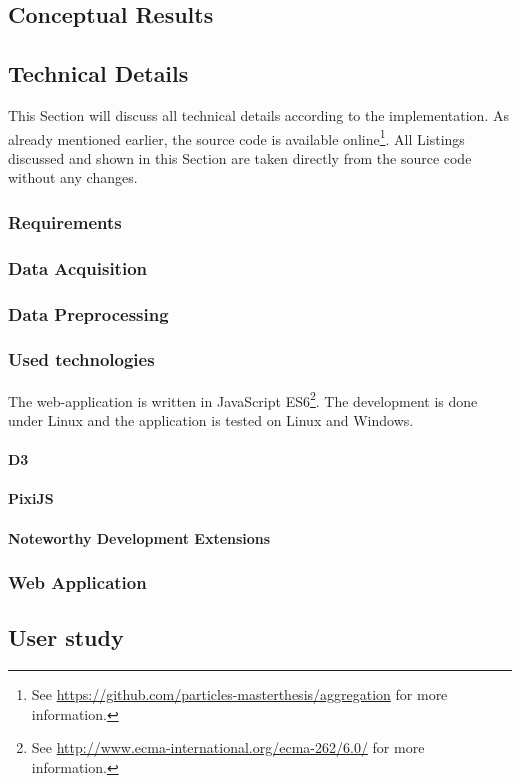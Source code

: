 \subsection{Conceptual Results}


\subsection{Technical Details}
\cbstart
This Section will discuss all technical details according to the implementation.
As already mentioned earlier, the source code is available online\footnote{See \href{https://github.com/particles-masterthesis/aggregation}{https://github.com/particles-masterthesis/aggregation} for more information.}. All Listings discussed and shown in this Section are taken directly from the source code without any changes.
\cbend

\subsubsection{Requirements}


\subsubsection{Data Acquisition}
\label{s:data-acquisition}


\subsubsection{Data Preprocessing}
\label{s:data-preprocessing}


\subsubsection{Used technologies}
The web-application is written in JavaScript ES6\footnote{See \href{http://www.ecma-international.org/ecma-262/6.0/}{http://www.ecma-international.org/ecma-262/6.0/} for more information.}. The development is done under Linux and the application is tested on Linux and Windows.

\paragraph{D3}


\paragraph{PixiJS}


\paragraph{Noteworthy Development Extensions}


\subsubsection{Web Application}
\label{s:web-application}


\subsection{User study}

